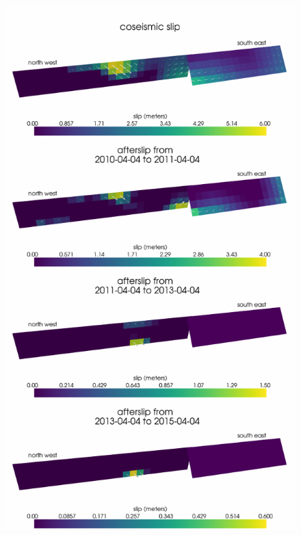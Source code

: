\documentclass[1p]{elsarticle}
\begin{document}
\begin{figure}
\includegraphics[scale=0.8]{Figures/FinalSlip}
\centering 
\caption{}
\label{fig:FinalSlip}
\end{figure}
\end{document}
